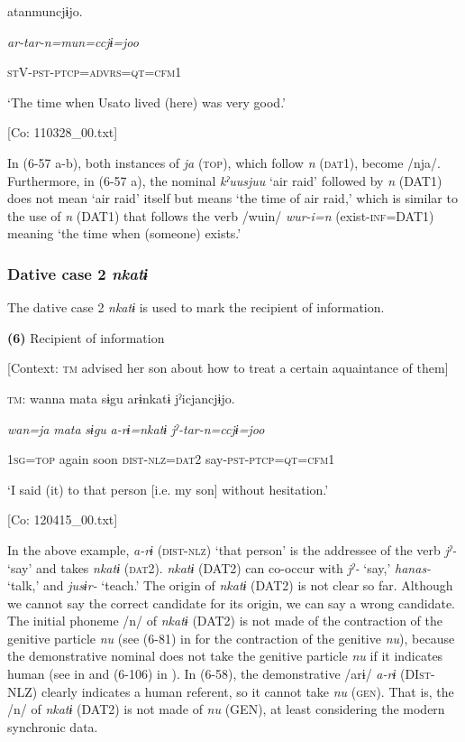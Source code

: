       atanmuncjɨjo.

      \textit{ar-tar-n=mun=ccjɨ=joo}

      \textsc{st}V-\textsc{pst}-\textsc{ptcp}=\textsc{advrs}=\textsc{qt}=\textsc{cfm}1

      ‘The time when Usato lived (here) was very good.’

      [Co: 110328\_00.txt]

In (6-57 a-b), both instances of \textit{ja} (\textsc{top}), which follow \textit{n} (\textsc{dat}1), become /nja/. Furthermore, in (6-57 a), the nominal \textit{kˀuusjuu} ‘air raid’ followed by \textit{n} (DAT1) does not mean ‘air raid’ itself but means ‘the time of air raid,’ which is similar to the use of \textit{n} (DAT1) that follows the verb /wuin/ \textit{wur-i=n} (exist-\textsc{inf}=DAT1) meaning ‘the time when (someone) exists.’

\subsubsection{Dative case 2 \textit{nkatɨ}}

The dative case 2 \textit{nkatɨ} is used to mark the recipient of information.

\textbf{(6)}  Recipient of information

  [Context: \textsc{tm} advised her son about how to treat a certain aquaintance of them]

  \textsc{tm}:  wanna  mata  sɨgu  arɨnkatɨ  jˀicjancjɨjo.

    \textit{wan=ja}  \textit{mata}  \textit{sɨgu}  \textit{a-rɨ=nkatɨ}  \textit{jˀ-tar-n=ccjɨ=joo}

    1\textsc{sg}=\textsc{top}  again  soon  \textsc{dist}-\textsc{nlz}=\textsc{dat}2  say-\textsc{pst}-\textsc{ptcp}=\textsc{qt}=\textsc{cfm}1

    ‘I said (it) to that person [i.e. my son] without hesitation.’

    [Co: 120415\_00.txt]

In the above example, \textit{a-rɨ} (\textsc{dist}-\textsc{nlz}) ‘that person’ is the addressee of the verb \textit{jˀ-} ‘say’ and takes \textit{nkatɨ} (\textsc{dat}2). \textit{nkatɨ} (DAT2) can co-occur with \textit{jˀ-} ‘say,’ \textit{hanas-} ‘talk,’ and \textit{jusɨr-} ‘teach.’ The origin of \textit{nkatɨ} (DAT2) is not clear so far. Although we cannot say the correct candidate for its origin, we can say a wrong candidate. The initial phoneme /n/ of \textit{nkatɨ} (DAT2) is not made of the contraction of the genitive particle \textit{nu} (see (6-81) in  for the contraction of the genitive \textit{nu}), because the demonstrative nominal does not take the genitive particle \textit{nu} if it indicates human (see  in  and (6-106) in ). In (6-58), the demonstrative /arɨ/ \textit{a-rɨ} (DI\textsc{st}-NLZ) clearly indicates a human referent, so it cannot take \textit{nu} (\textsc{gen}). That is, the /n/ of \textit{nkatɨ} (DAT2) is not made of \textit{nu} (GEN), at least considering the modern synchronic data.

